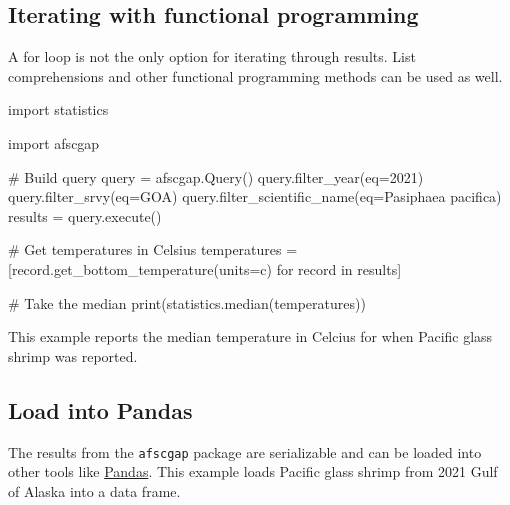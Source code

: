 \documentclass[
  letterpaper,
  oneside,
  open=any]{scrbook}
\newenvironment{Shaded}{\begin{snugshade}}{\end{snugshade}}
\newcommand{\AttributeTok}[1]{\textcolor[rgb]{0.40,0.45,0.13}{#1}}
\newcommand{\CommentTok}[1]{\textcolor[rgb]{0.37,0.37,0.37}{#1}}
\newcommand{\ControlFlowTok}[1]{\textcolor[rgb]{0.00,0.23,0.31}{#1}}
\newcommand{\DecValTok}[1]{\textcolor[rgb]{0.68,0.00,0.00}{#1}}
\newcommand{\FunctionTok}[1]{\textcolor[rgb]{0.28,0.35,0.67}{#1}}
\newcommand{\NormalTok}[1]{\textcolor[rgb]{0.00,0.23,0.31}{#1}}
\newcommand{\OtherTok}[1]{\textcolor[rgb]{0.00,0.23,0.31}{#1}}
\newcommand{\StringTok}[1]{\textcolor[rgb]{0.13,0.47,0.30}{#1}}
\begin{document}
\subsection{Iterating with functional
programming}\label{iterating-with-functional-programming}

A for loop is not the only option for iterating through results. List
comprehensions and other functional programming methods can be used as
well.

\begin{Shaded}
\begin{Highlighting}[]
\NormalTok{import statistics}

\NormalTok{import afscgap}

\CommentTok{\# Build query}
\NormalTok{query }\OtherTok{=} \FunctionTok{afscgap.Query}\NormalTok{()}
\FunctionTok{query.filter\_year}\NormalTok{(}\AttributeTok{eq=}\DecValTok{2021}\NormalTok{)}
\FunctionTok{query.filter\_srvy}\NormalTok{(}\AttributeTok{eq=}\StringTok{\textquotesingle{}GOA\textquotesingle{}}\NormalTok{)}
\FunctionTok{query.filter\_scientific\_name}\NormalTok{(}\AttributeTok{eq=}\StringTok{\textquotesingle{}Pasiphaea pacifica\textquotesingle{}}\NormalTok{)}
\NormalTok{results }\OtherTok{=} \FunctionTok{query.execute}\NormalTok{()}

\CommentTok{\# Get temperatures in Celsius}
\NormalTok{temperatures }\OtherTok{=}\NormalTok{ [}\FunctionTok{record.get\_bottom\_temperature}\NormalTok{(}\AttributeTok{units=}\StringTok{\textquotesingle{}c\textquotesingle{}}\NormalTok{) }\ControlFlowTok{for}\NormalTok{ record }\ControlFlowTok{in}\NormalTok{ results]}

\CommentTok{\# Take the median}
\FunctionTok{print}\NormalTok{(}\FunctionTok{statistics.median}\NormalTok{(temperatures))}
\end{Highlighting}
\end{Shaded}

This example reports the median temperature in Celcius for when Pacific
glass shrimp was reported.

\subsection{Load into Pandas}\label{load-into-pandas}

The results from the \texttt{afscgap} package are serializable and can
be loaded into other tools like
\href{https://pandas.pydata.org/}{Pandas}. This example loads Pacific
glass shrimp from 2021 Gulf of Alaska into a data frame.
\end{document}
